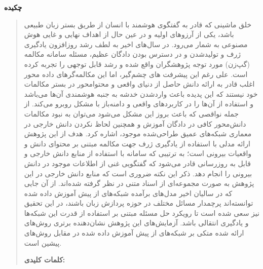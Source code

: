 \thispagestyle{empty}
\centerline{\textbf{\large{چکیده}}}
\begin{quote}
	خلق ماشینی که قادر به گفتگوی هوشمند با انسان از طریق بستر زبان طبیعی باشد، یکی از آرزوهای اولیه و در عین حال از اهداف 
	نهایی و غایی هوش مصنوعی به شمار می‌رود. 
	در سال‌های اخیر به لطف رشد روزافزون یادگیری ژرف و تولیدشدن و در دسترس بودن دادگان عظیم، مسئله سامانه‌ مکالمه (گپ‌زن) مورد توجه
	پژوهشگران واقع شده و رشد قابل توجهی را تجربه کرده است.
	علی رغم این پیشرفت های چشم‌گیر، اما این مکالمه‌گر‌های داده محور اغلب قادر به ارائه دانش حاصل از دنیای واقعی و محتوامحور در بستر مکالمات خود نیستند که این پدیده باعث واردشدن خدشه به جنبه هوشمندی آن‌ها می‌باشد و استفاده از آن‌ها را در کاربردهای واقعی
	و دامنه‌باز
	با مشکل روبرو می‌کند.
	از جمله نواقصی که باعث بروز این مشکل می‌شود می‌توان به نبود مکالمات دانش‌محور کافی در دادگان آموزش و همچنین لحاظ نکردن دانش خارجی در معماری شبکه‌های عمیق طراحی‌شده موجود، اشاره کرد.
	\newline  
	هدف از این پژوهش ارائه مدلی با استفاده از یادگیری ژرف جهت مکالمه مبتنی بر محتوای دانش و واقعیات بیرونی است؛ به ترتیبی که سامانه با استفاده از منابع دانش خارجی و قابل به روزرسانی قادر می‌شود که گفتگویی غنی از اطلاعات موجود در دانش بیرونی را انجام دهد. ذکر این نکته ضروری است که منابع دانش خارجی در این پژوهش به صورت مجموعه‌ای از اسناد متنی در نظر گرفته شده‌اند.
	\newline
	از آن جایی که در سالیان اخیر مدل‌های برآمده شبکه‌های از پیش آموزش داده شده توانسته‌اند پرچمدار مسائل مختلف در حوزه پردازش زبان باشند، در این تحقیق نیز سعی شده است تا رویکرد حل مسئله مبتنی بر استفاده از قدرت این شبکه‌ها و یادگیری انتقالی باشد. آزمایش‌های این پژوهش نشان‌دهنده برتری روش‌های ارائه شده متکی بر شبکه‌های از پیش آموزش داده شده در مقابل روش‌های پیشین است.
	
	\vskip 1cm
	\textbf{کلمات کلیدی:} 
\end{quote}
